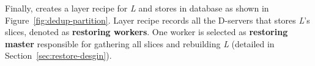 %



Finally, 
\sysname creates a
layer recipe for \emph{L} and stores in database as shown in Figure~\ref{fig:dedup-partition}.
Layer recipe records all the D-servers that stores \emph{L}'s slices, denoted as \textbf{restoring workers}.
One worker is selected as \textbf{restoring master} responsible for gathering all slices and rebuilding \emph{L} (detailed in Section~\ref{sec:restore-desgin}).
%
%

